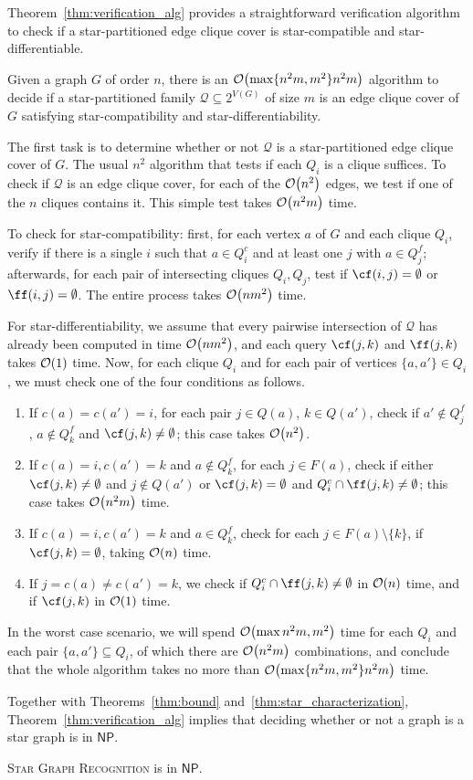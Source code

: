 Theorem~\ref{thm:verification_alg} provides a straightforward verification algorithm to check if a star-partitioned edge clique cover is star-compatible and star-differentiable.

\begin{theorem}
    \label{thm:verification_alg}
    Given a graph $G$ of order $n$, there is an $\mathcal{O}\!\left(\max\{n^2m, m^2\}n^2m\right)$ algorithm to decide if a star-partitioned family $\mathcal{Q} \subseteq 2^{V(G)}$ of size $m$ is an edge clique cover of $G$ satisfying star-compatibility and star-differentiability. 
\end{theorem}

\begin{tproof}
    The first task is to determine whether or not $\mathcal{Q}$ is a star-partitioned edge clique cover of $G$.
    The usual $n^2$ algorithm that tests if each $Q_i$ is a clique suffices.
    To check if $\mathcal{Q}$ is an edge clique cover, for each of the $\mathcal{O}\!\left(n^2\right)$ edges, we test if one of the $n$ cliques contains it. 
    This simple test takes $\mathcal{O}\!\left(n^2m\right)$ time.
    
    To check for star-compatibility: first, for each vertex $a$ of $G$ and each clique $Q_i$, verify if there is a single $i$ such that $a \in Q_i^c$ and at least one $j$ with $a \in Q_j^f$;
    afterwards, for each pair of intersecting cliques $Q_i, Q_j$, test if $\cf(i,j) = \emptyset$ or $\ff(i,j) = \emptyset$.
    The entire process takes $\mathcal{O}\!\left(nm^2\right)$ time.
    
    For star-differentiability, we assume that every pairwise intersection of $\mathcal{Q}$ has already been computed in time $\mathcal{O}\!\left(nm^2\right)$, and each query $\cf(j,k)$ and $\ff(j,k)$ takes $\mathcal{O}\!\left(1\right)$ time.
    Now, for each clique $Q_i$ and for each pair of vertices $\{a, a'\} \in Q_i$, we must check one of the four conditions as follows.
    \begin{enumerate}
        \item If $c(a) = c(a') = i$, for each pair $j \in Q(a)$, $k \in Q(a')$, check if $a' \notin Q_j^f$, $a \notin Q_k^f$ and $\cf(j,k) \neq \emptyset$; this case takes $\mathcal{O}\!\left(n^2\right)$.
        \item If $c(a) = i, c(a') = k$ and $a \notin Q_k^f$, for each $j \in F(a)$, check if either $\cf(j,k) \neq \emptyset$ and $j \notin Q(a')$ or $\cf(j,k) = \emptyset$ and $Q_i^c \cap \ff(j,k) \neq \emptyset$; this case takes $\mathcal{O}\!\left(n^2m\right)$ time.
        \item If $c(a) = i, c(a') = k$ and $a \in Q_k^f$, check for each $j \in F(a) \setminus \{k\}$, if $\cf(j,k) = \emptyset$, taking $\mathcal{O}\!\left(n\right)$ time.
        \item If $j = c(a) \neq c(a') = k$, we check if $Q_i^c \cap \ff(j,k) \neq \emptyset$ in $\mathcal{O}\!\left(n\right)$ time, and if $\cf(j,k)$ in $\mathcal{O}\!\left(1\right)$ time.
    \end{enumerate}
    In the worst case scenario, we will spend $\mathcal{O}\!\left(\max{n^2m, m^2}\right)$ time for each $Q_i$ and each pair $\{a, a'\} \subseteq Q_i$, of which there are $\mathcal{O}\!\left(n^2m\right)$ combinations, and conclude that the whole algorithm takes no more than $\mathcal{O}\!\left(\max\{n^2m, m^2\}n^2m\right)$ time.
\end{tproof}

Together with Theorems~\ref{thm:bound} and~\ref{thm:star_characterization}, Theorem~\ref{thm:verification_alg} implies that deciding whether or not a graph is a star graph is in $\mathsf{NP}$.

\begin{theorem}
    \textsc{Star Graph Recognition} is in $\mathsf{NP}$.
\end{theorem}